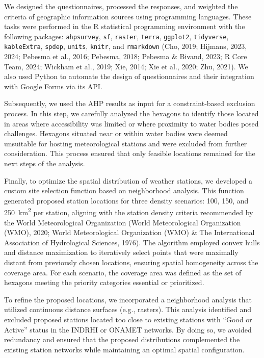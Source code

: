 \documentclass[spanish]{article}
\begin{document}
We designed the questionnaires, processed the responses, and weighted
the criteria of geographic information sources using programming
languages. These tasks were performed in the R statistical programming
environment with the following packages: \texttt{ahpsurvey},
\texttt{sf}, \texttt{raster}, \texttt{terra}, \texttt{ggplot2},
\texttt{tidyverse}, \texttt{kableExtra}, \texttt{spdep}, \texttt{units},
\texttt{knitr}, and \texttt{rmarkdown} (Cho, 2019; Hijmans, 2023, 2024;
Pebesma et al., 2016; Pebesma, 2018; Pebesma \& Bivand, 2023; R Core
Team, 2024; Wickham et al., 2019; Xie, 2014; Xie et al., 2020; Zhu,
2021). We also used Python to automate the design of questionnaires and
their integration with Google Forms via its API.

Subsequently, we used the AHP results as input for a constraint-based
exclusion process. In this step, we carefully analyzed the hexagons to
identify those located in areas where accessibility was limited or where
proximity to water bodies posed challenges. Hexagons situated near or
within water bodies were deemed unsuitable for hosting meteorological
stations and were excluded from further consideration. This process
ensured that only feasible locations remained for the next steps of the
analysis.

Finally, to optimize the spatial distribution of weather stations, we
developed a custom site selection function based on neighborhood
analysis. This function generated proposed station locations for three
density scenarios: 100, 150, and 250~km\textsuperscript{2} per station,
aligning with the station density criteria recommended by the World
Meteorological Organization (World Meteorological Organization (WMO),
2020; World Meteorological Organization (WMO) \& The International
Association of Hydrological Sciences, 1976). The algorithm employed
convex hulls and distance maximization to iteratively select points that
were maximally distant from previously chosen locations, ensuring
spatial homogeneity across the coverage area. For each scenario, the
coverage area was defined as the set of hexagons meeting the priority
categories essential or prioritized.

To refine the proposed locations, we incorporated a neighborhood
analysis that utilized continuous distance surfaces (e.g., rasters).
This analysis identified and excluded proposed stations located too
close to existing stations with ``Good or Active'' status in the INDRHI
or ONAMET networks. By doing so, we avoided redundancy and ensured that
the proposed distributions complemented the existing station networks
while maintaining an optimal spatial configuration.
\end{document}
